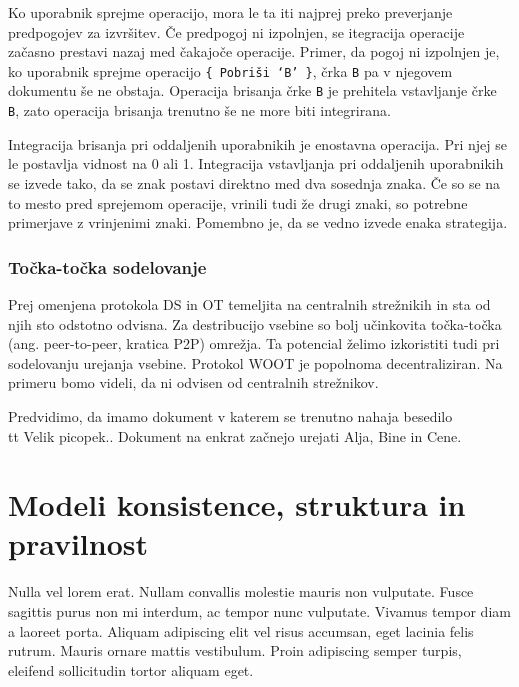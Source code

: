 \documentclass[a4paper, 12pt, twoside]{book}
\begin{document}
Ko uporabnik sprejme operacijo, mora le ta iti najprej preko preverjanje predpogojev za izvršitev. Če predpogoj ni izpolnjen, se itegracija operacije začasno prestavi nazaj med čakajoče operacije. Primer, da pogoj ni izpolnjen je, ko uporabnik sprejme operacijo {\tt \{ Pobriši ‘B’ \}}, črka {\tt B} pa v njegovem dokumentu še ne obstaja. Operacija brisanja črke {\tt B} je prehitela vstavljanje črke {\tt B}, zato operacija brisanja trenutno še ne more biti integrirana.

Integracija brisanja pri oddaljenih uporabnikih je enostavna operacija. Pri njej se le postavlja vidnost na 0 ali 1. Integracija vstavljanja pri oddaljenih uporabnikih se izvede tako, da se znak postavi direktno med dva sosednja znaka. Če so se na to mesto pred sprejemom operacije, vrinili tudi že drugi znaki, so potrebne primerjave z vrinjenimi znaki. Pomembno je, da se vedno izvede enaka strategija.


\subsection{Točka-točka sodelovanje}

Prej omenjena protokola DS in OT temeljita na centralnih strežnikih in sta od njih sto odstotno odvisna. Za destribucijo vsebine so bolj učinkovita točka-točka (ang. peer-to-peer, kratica P2P) omrežja. Ta potencial želimo izkoristiti tudi pri sodelovanju urejanja vsebine. Protokol WOOT je popolnoma decentraliziran. Na primeru bomo videli, da ni odvisen od centralnih strežnikov.

Predvidimo, da imamo dokument v katerem se trenutno nahaja besedilo {\\tt Velik picopek.}. Dokument na enkrat začnejo urejati Alja, Bine in Cene. 


\chapter{Modeli konsistence, struktura in pravilnost}

Nulla vel lorem erat. Nullam convallis molestie mauris non vulputate. Fusce sagittis purus non mi interdum, ac tempor nunc vulputate. Vivamus tempor diam a laoreet porta. Aliquam adipiscing elit vel risus accumsan, eget lacinia felis rutrum. Mauris ornare mattis vestibulum. Proin adipiscing semper turpis, eleifend sollicitudin tortor aliquam eget.
\end{document}

